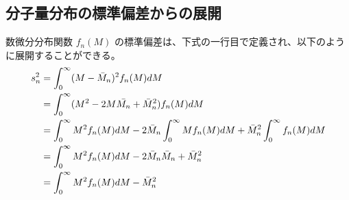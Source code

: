 \documentclass[a4paper,11pt]{ltjsarticle}
\newcommand{\diff}{\mathrm d}
\newcommand{\difd}[2]{\dfrac{\diff #1}{\diff #2}}
\begin{document}
\begin{appendix}
%
%
%
\newpage
\section{分子量分布の標準偏差からの展開}
\label{sec:MwMn}

数微分分布関数 $f_n(M)$ の標準偏差は、下式の一行目で定義され、以下のように展開することができる。
\begin{align}
s_n^2
	&= \displaystyle \int_0^{\infty}(M - \bar{M}_n)^2 f_n(M) dM \notag \\
	&= \displaystyle \int_0^{\infty}(M^2 - 2M \bar{M_n} + \bar{M}_n^2) f_n(M) dM \notag \\
	&= \displaystyle \int_0^{\infty} M^2 f_n(M) dM - 2 \bar{M}_n \displaystyle \int_0^{\infty} M f_n(M) dM + \bar{M}_n^2 \displaystyle \int_0^{\infty} f_n(M) dM \notag \\
	&= \displaystyle \int_0^{\infty} M^2 f_n(M) dM - 2 \bar{M}_n \bar{M}_n + \bar{M}_n^2  \notag \\
	&= \displaystyle \int_0^{\infty} M^2 f_n(M) dM - \bar{M}_n^2
\end{align}


\end{appendix}
\end{document}
